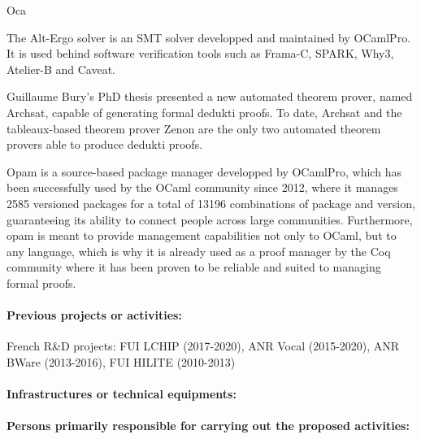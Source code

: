 \begin{sitedescription}{Oca}
\begin{compactitem}
\item The Alt-Ergo solver\cite{ae2.2} is an SMT solver developped and maintained by OCamlPro.
  It is used behind software verification tools such as Frama-C, SPARK, Why3,
  Atelier-B and Caveat.
\item Guillaume Bury's PhD thesis\cite{BURY19} presented a new automated theorem
  prover, named Archsat, capable of generating formal dedukti proofs. To date,
  Archsat and the tableaux-based theorem prover Zenon are the only two automated
  theorem provers able to produce dedukti proofs.
\item Opam\cite{OPAM} is a source-based package manager developped by OCamlPro,
  which has been successfully used by the OCaml community since 2012, where
  it manages 2585 versioned packages for a total of 13196 combinations of package
  and version, guaranteeing its ability to connect people across large communities.
  Furthermore, opam is meant to provide management capabilities not only to
  OCaml, but to any language, which is why it is already used as a proof manager
  by the Coq community where it has been proven to be reliable and suited to
  managing formal proofs.
\end{compactitem}

\paragraph*{Previous projects or activities:}


\begin{compactitem}
\item French R\&D projects: FUI LCHIP (2017-2020), ANR Vocal (2015-2020), ANR BWare (2013-2016), FUI HILITE (2010-2013)
\end{compactitem}

\paragraph*{Infrastructures or technical equipments:}


\paragraph*{Persons primarily responsible for carrying out the proposed activities:}


\end{sitedescription}
